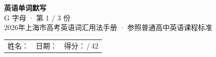 \documentclass[10pt,a4paper]{article}
\begin{document}
\pagestyle{plain}

\begin{center}
{\LARGE\bfseries 英语单词默写}\\[0.22em]
{\large G 字母 · 第 1 / 3 份}\\[0.18em]
{\small 2026年上海市高考英语词汇用法手册 · 参照普通高中英语课程标准}
\end{center}

\vspace{0.25em}
\noindent\begin{tabular}{@{}p{}@{}p{}@{}p{}@{}}
姓名：\underline{\hspace{2.0cm}} & 日期：\underline{\hspace{2.0cm}} & 得分：\underline{\hspace{1.3cm}}\,/\,42 \\
\end{tabular}

\vspace{0.3em}

\vspace{0.08em}
\end{document}
